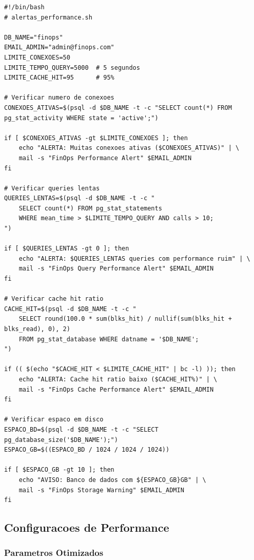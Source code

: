 \begin{lstlisting}[caption=Script de alerta de performance]
#!/bin/bash
# alertas_performance.sh

DB_NAME="finops"
EMAIL_ADMIN="admin@finops.com"
LIMITE_CONEXOES=50
LIMITE_TEMPO_QUERY=5000  # 5 segundos
LIMITE_CACHE_HIT=95      # 95%

# Verificar numero de conexoes
CONEXOES_ATIVAS=$(psql -d $DB_NAME -t -c "SELECT count(*) FROM pg_stat_activity WHERE state = 'active';")

if [ $CONEXOES_ATIVAS -gt $LIMITE_CONEXOES ]; then
    echo "ALERTA: Muitas conexoes ativas ($CONEXOES_ATIVAS)" | \
    mail -s "FinOps Performance Alert" $EMAIL_ADMIN
fi

# Verificar queries lentas
QUERIES_LENTAS=$(psql -d $DB_NAME -t -c "
    SELECT count(*) FROM pg_stat_statements 
    WHERE mean_time > $LIMITE_TEMPO_QUERY AND calls > 10;
")

if [ $QUERIES_LENTAS -gt 0 ]; then
    echo "ALERTA: $QUERIES_LENTAS queries com performance ruim" | \
    mail -s "FinOps Query Performance Alert" $EMAIL_ADMIN
fi

# Verificar cache hit ratio
CACHE_HIT=$(psql -d $DB_NAME -t -c "
    SELECT round(100.0 * sum(blks_hit) / nullif(sum(blks_hit + blks_read), 0), 2)
    FROM pg_stat_database WHERE datname = '$DB_NAME';
")

if (( $(echo "$CACHE_HIT < $LIMITE_CACHE_HIT" | bc -l) )); then
    echo "ALERTA: Cache hit ratio baixo ($CACHE_HIT%)" | \
    mail -s "FinOps Cache Performance Alert" $EMAIL_ADMIN
fi

# Verificar espaco em disco
ESPACO_BD=$(psql -d $DB_NAME -t -c "SELECT pg_database_size('$DB_NAME');")
ESPACO_GB=$((ESPACO_BD / 1024 / 1024 / 1024))

if [ $ESPACO_GB -gt 10 ]; then
    echo "AVISO: Banco de dados com ${ESPACO_GB}GB" | \
    mail -s "FinOps Storage Warning" $EMAIL_ADMIN
fi
\end{lstlisting}

\subsection{Configuracoes de Performance}

\subsubsection{Parametros Otimizados}


